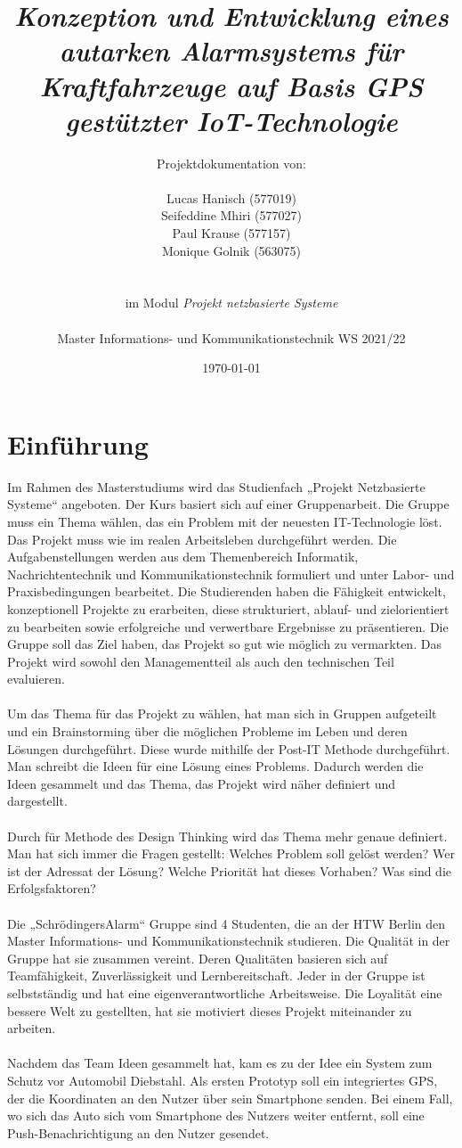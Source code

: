\documentclass[11pt,a4paper,ngerman]{report}
\date{\today}
\title{ \textbf{\textit{Konzeption und Entwicklung eines autarken Alarmsystems für Kraftfahrzeuge auf Basis GPS gestützter IoT-Technologie}}}
\author{Projektdokumentation von: \\ \\ Lucas Hanisch (577019) \\ Seifeddine Mhiri (577027) \\ Paul Krause (577157)  \\  Monique Golnik (563075) \\ \\ \\ im Modul \textit{Projekt netzbasierte Systeme} \\ \\ Master Informations- und Kommunikationstechnik WS 2021/22 }
\begin{document}
	\maketitle
	\tableofcontents
	
\chapter{Einführung}
	
Im Rahmen des Masterstudiums wird das Studienfach „Projekt Netzbasierte Systeme“ angeboten. Der Kurs basiert sich auf einer Gruppenarbeit.
Die Gruppe muss ein Thema wählen, das ein Problem mit der neuesten IT-Technologie löst. Das Projekt muss wie im realen Arbeitsleben durchgeführt werden. Die Aufgabenstellungen werden aus dem Themenbereich Informatik, Nachrichtentechnik und Kommunikationstechnik formuliert und unter Labor- und
Praxisbedingungen bearbeitet. Die Studierenden haben die Fähigkeit entwickelt, konzeptionell Projekte zu erarbeiten, diese strukturiert, ablauf- und zielorientiert zu
bearbeiten sowie erfolgreiche und verwertbare Ergebnisse zu präsentieren.
Die Gruppe soll das Ziel haben, das Projekt so gut wie möglich zu vermarkten.
Das Projekt wird sowohl den Managementteil als auch den technischen Teil evaluieren.\\\\
Um das Thema für das Projekt zu wählen, hat man sich in Gruppen aufgeteilt und ein Brainstorming über die möglichen Probleme im Leben und deren Lösungen durchgeführt. 
Diese wurde mithilfe der Post-IT Methode durchgeführt. Man schreibt die Ideen für eine Lösung eines Problems.
Dadurch werden die Ideen gesammelt und das Thema, das Projekt wird näher definiert und  dargestellt. \\\\
Durch für Methode des Design Thinking wird das Thema mehr genaue definiert. Man hat sich immer die Fragen gestellt: Welches Problem soll gelöst werden? Wer ist der Adressat der Lösung? Welche Priorität hat dieses Vorhaben? Was sind die Erfolgsfaktoren? \\\\
Die „SchrödingersAlarm“ Gruppe sind 4 Studenten, die an der HTW Berlin den Master Informations- und Kommunikationstechnik studieren. Die Qualität in der Gruppe hat sie zusammen vereint. Deren Qualitäten basieren sich auf Teamfähigkeit, Zuverlässigkeit und Lernbereitschaft. Jeder in der Gruppe ist selbstständig und hat eine eigenverantwortliche Arbeitsweise. Die Loyalität eine bessere Welt zu gestellten, hat sie motiviert dieses Projekt miteinander zu arbeiten.\\\\
Nachdem das Team Ideen gesammelt hat, kam es zu der Idee ein System zum Schutz vor Automobil Diebstahl. 
Als ersten Prototyp soll ein integriertes GPS, der die Koordinaten an den Nutzer über sein Smartphone senden. 
Bei einem Fall, wo sich das Auto sich vom Smartphone des Nutzers weiter entfernt, soll eine Push-Benachrichtigung an den Nutzer gesendet.
	
\end{document}
